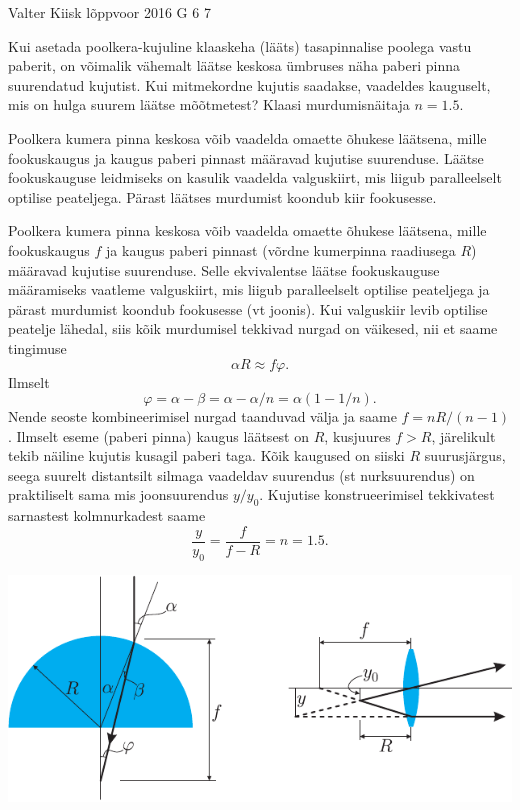 {Valter Kiisk} %
{lõppvoor} %
{2016} %
{G 6} %
{7} %
{
\ifStatement
Kui asetada poolkera-kujuline klaaskeha (lääts) tasapinnalise poolega vastu paberit, on võimalik vähemalt läätse keskosa ümbruses näha paberi pinna suurendatud kujutist. Kui mitmekordne kujutis saadakse, vaadeldes kauguselt, mis on hulga suurem läätse mõõtmetest? Klaasi murdumisnäitaja $n=\num{1.5}$.
\pagebreak
\fi


\ifHint
Poolkera kumera pinna keskosa võib vaadelda omaette õhukese läätsena, mille fookuskaugus ja kaugus paberi pinnast määravad kujutise suurenduse. Läätse fookuskauguse leidmiseks on kasulik vaadelda valguskiirt, mis liigub paralleelselt optilise peateljega. Pärast läätses murdumist koondub kiir fookusesse.
\fi


\ifSolution
Poolkera kumera pinna keskosa võib vaadelda omaette õhukese läätsena, mille fookuskaugus $f$ ja kaugus paberi pinnast (võrdne kumerpinna raadiusega $R$) määravad kujutise suurenduse. Selle ekvivalentse läätse fookuskauguse määramiseks vaatleme valguskiirt, mis liigub paralleelselt optilise peateljega ja pärast murdumist koondub fookusesse (vt joonis). Kui valguskiir levib optilise peatelje lähedal, siis kõik murdumisel tekkivad nurgad on väikesed, nii et saame tingimuse
\[
\alpha R\approx f\varphi.
\]
Ilmselt
\[
\varphi = \alpha - \beta=\alpha-\alpha/n=\alpha(1-1/n).
\]
Nende seoste kombineerimisel nurgad taanduvad välja ja saame $f=nR/(n-1)$. Ilmselt eseme (paberi pinna) kaugus läätsest on $R$, kusjuures $f > R$, järelikult tekib näiline kujutis kusagil paberi taga. Kõik kaugused on siiski $R$ suurusjärgus, seega suurelt distantsilt silmaga vaadeldav suurendus (st nurksuurendus) on praktiliselt sama mis joonsuurendus $y/y_0$. Kujutise konstrueerimisel tekkivatest sarnastest kolmnurkadest saame
\[
\frac{y}{y_0}=\frac{f}{f-R}=n=\num{1.5}.
\]

\begin{center}
	\includegraphics[scale=1.2]{2016-v3g-06-luup-lah}
\end{center}
\fi


}
